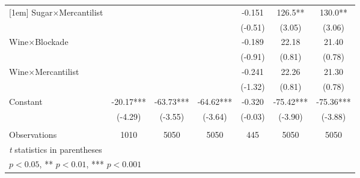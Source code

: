 {\begin{tabular}{l*{6}{c}}
[1em]
Sugar$\times$Mercantilist&                     &                     &                     &      -0.151         &       126.5** &       130.0** \\
                    &                     &                     &                     &     (-0.51)         &      (3.05)         &      (3.06)         \\
[1em]
Wine$\times$Blockade&                     &                     &                     &      -0.189         &       22.18         &       21.40         \\
                    &                     &                     &                     &     (-0.91)         &      (0.81)         &      (0.78)         \\
[1em]
Wine$\times$Mercantilist&                     &                     &                     &      -0.241         &       22.26         &       21.30         \\
                    &                     &                     &                     &     (-1.32)         &      (0.81)         &      (0.78)         \\
[1em]
Constant            &      -20.17***&      -63.73***&      -64.62***&      -0.320         &      -75.42***&      -75.36***\\
                    &     (-4.29)         &     (-3.55)         &     (-3.64)         &     (-0.03)         &     (-3.90)         &     (-3.88)         \\
\hline\\
Observations        &        1010         &        5050         &        5050         &         445         &        5050         &        5050         \\
\hline\hline
\multicolumn{7}{l}{\footnotesize \textit{t} statistics in parentheses}\\
\multicolumn{7}{l}{\footnotesize * \(p<0.05\), ** \(p<0.01\), *** \(p<0.001\)}\\
\end{tabular}
}
